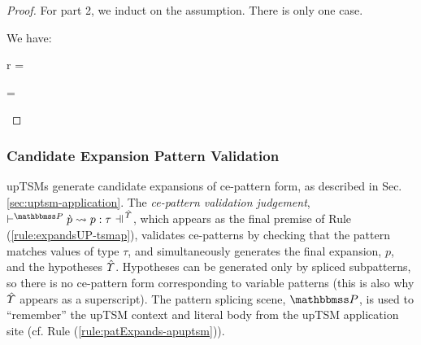 {{{{\begin{proof}
For part 2, we induct on the assumption. There is only one case.
\begin{byCases}
\item[\text{(\ref{rule:ruleType})}] We have:
  \begin{pfsteps}
    \item r =  
    \item {} =  
    \item {}  
    \item {}  
    \item {}  
    \item {} 
  \end{pfsteps}
  \resetpfcounter
\end{byCases}
\end{proof}

\subsubsection{Candidate Expansion Pattern Validation}
upTSMs generate candidate expansions of ce-pattern form, as described in Sec. \ref{sec:uptsm-application}. The \emph{ce-pattern validation judgement}, $\cvalidP{\upctx}{\pscenev}{\cpv}{p}{\tau}$, which appears as the final premise of Rule (\ref{rule:expandsUP-tsmap}), validates ce-patterns by checking that the pattern matches values of type $\tau$, and simultaneously generates the final expansion, $p$, and the hypotheses $\hat\varUpsilon$. Hypotheses can be generated only by spliced subpatterns, so there is no ce-pattern form corresponding to variable patterns (this is also why $\hat\varUpsilon$ appears as a superscript). The pattern splicing scene, $\pscenev$, is used to ``remember'' the upTSM context and literal body from the upTSM application site (cf. Rule (\ref{rule:patExpands-apuptsm})).

}}}}
